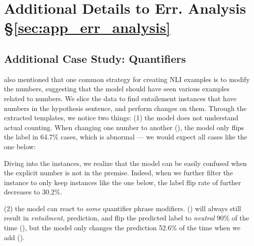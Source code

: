 \section{Additional Details to Err. Analysis \S\ref{sec:app_err_analysis}}
\label{appendix:err_analysis}

\subsection{Additional Case Study: Quantifiers}
\label{appendix:err_analysis_quantifier_case}


\citet{gururangan2018annotation} also mentioned that one common strategy for creating NLI examples is to modify the numbers, suggesting that the model should have seen various examples related to numbers.
We slice the data to find entailement instances that have numbers in the hypothesis sentence, and perform  changes on them.
Through the extracted templates, we notice two things: 
(1) the model does not understand actual counting. 
When changing one number to another (), the model only flips the label in 64.7\% cases, which is abnormal --- we would expect all cases like the one below:


Diving into the instances, we realize that the model can be easily confused when the explicit number is not in the premise. Indeed, when we further filter the instance to only keep instances like the one below, the label flip rate of  further decreases to 30.2\%.


(2) the model can react to \emph{some} quantifier phrase modifiers. 
 () will always still result in \emph{entailment}, prediction,  and  flip the predicted label to \emph{neutral} 90\% of the time (), but the model only changes the prediction 52.6\% of the time when we add  ().


